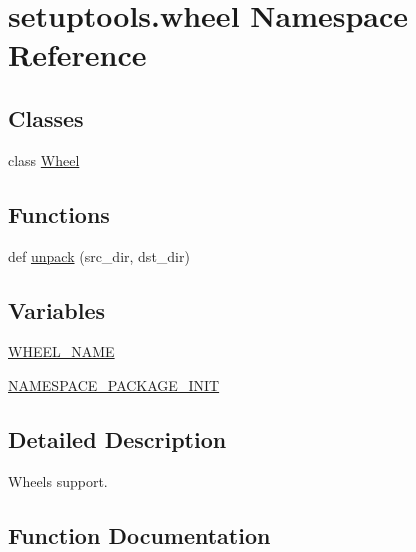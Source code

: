 \hypertarget{namespacesetuptools_1_1wheel}{}\section{setuptools.\+wheel Namespace Reference}
\label{namespacesetuptools_1_1wheel}
\subsection*{Classes}
\begin{DoxyCompactItemize}
\item 
class \hyperlink{classsetuptools_1_1wheel_1_1Wheel}{Wheel}
\end{DoxyCompactItemize}
\subsection*{Functions}
\begin{DoxyCompactItemize}
\item 
def \hyperlink{namespacesetuptools_1_1wheel_ad6c9d6d0747d13b18934c45872e07ac8}{unpack} (src\+\_\+dir, dst\+\_\+dir)
\end{DoxyCompactItemize}
\subsection*{Variables}
\begin{DoxyCompactItemize}
\item 
\hyperlink{namespacesetuptools_1_1wheel_a9843ec59778fbca1fd66dcd7f8773cc9}{W\+H\+E\+E\+L\+\_\+\+N\+A\+ME}
\item 
\hyperlink{namespacesetuptools_1_1wheel_af1bf3e47ff942b2f0bd00d92907bb602}{N\+A\+M\+E\+S\+P\+A\+C\+E\+\_\+\+P\+A\+C\+K\+A\+G\+E\+\_\+\+I\+N\+IT}
\end{DoxyCompactItemize}


\subsection{Detailed Description}
\begin{DoxyVerb}Wheels support.\end{DoxyVerb}
 

\subsection{Function Documentation}
\mbox{\label{namespacesetuptools_1_1wheel_ad6c9d6d0747d13b18934c45872e07ac8}} 
